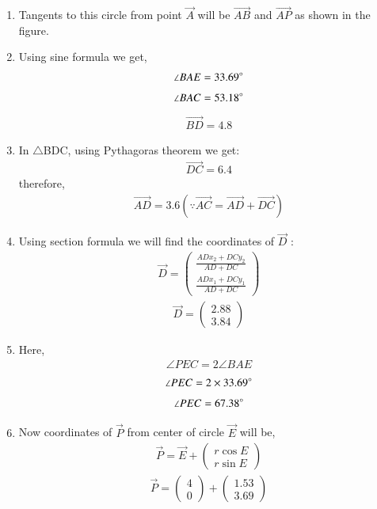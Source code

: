 \documentclass[journal,12pt,twocolumn]{IEEEtran}
\newcommand{\myvec}[1]{\ensuremath{\begin{pmatrix}#1\end{pmatrix}}}
\begin{document}
\begin{enumerate}
    \item Tangents to this circle from point $\vec{A}$ will be $\vec{AB}$ and $\vec{AP}$ as shown in the figure.\\
    \item Using sine formula we get,
    \begin{align}
    \angle BAE=33.69\degree
    \end{align}
    \begin{align}
        \angle BAC=53.18\degree
    \end{align}
    \begin{align}
       \vec{BD}= 4.8
    \end{align}
    \item In $\triangle$BDC, using Pythagoras theorem we get:
    \begin{align}
        \vec{DC}= 6.4
    \end{align}
    therefore, \begin{align}
    \vec{AD}= 3.6 (\because \vec{AC}= \vec{AD}+\vec{DC})
    \end{align}
    \item Using section formula we will find the coordinates of $\vec{D}$ :
    \begin{align}
        \vec{D}=\myvec{\frac{ADx_2+DCy_2}{AD+DC}\\ \frac{ADx_1+DCy_1}{AD+DC}}
    \end{align}
    \begin{align}
        \vec{D}=\myvec{2.88\\3.84}
    \end{align}
\item Here,
\begin{align}
\angle PEC= 2\angle BAE
\end{align}
\begin{align}
    \angle PEC=2\times 33.69\degree
\end{align}
\begin{align}
    \angle PEC= 67.38\degree
\end{align}
\item Now coordinates of $\vec{P}$ from center of circle $\vec{E}$ will be,
\begin{align}
    \vec{P}= \vec{E}+\myvec{r\cos E\\r\sin E}
\end{align}
\begin{align}
    \vec{P}=\myvec{4\\0}+\myvec{1.53\\3.69}
\end{align}

\end{enumerate}
\end{document}
